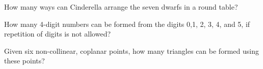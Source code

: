 \begin{questions}

\question How many ways can Cinderella arrange the seven dwarfs in a round table?
\begin{multicols}{4}
\begin{choices} 
\end{choices}
\end{multicols}

\question How many 4-digit numbers can be formed from the digits 0,1, 2, 3, 4, and 5, if repetition of digits is not allowed? 
\begin{multicols}{4}
\begin{choices} 
\end{choices}
\end{multicols}

\question Given six non-collinear, coplanar points, how many triangles can be formed using these points?
\begin{multicols}{4}
\begin{choices} 
\end{choices}
\end{multicols}

\end{questions}






